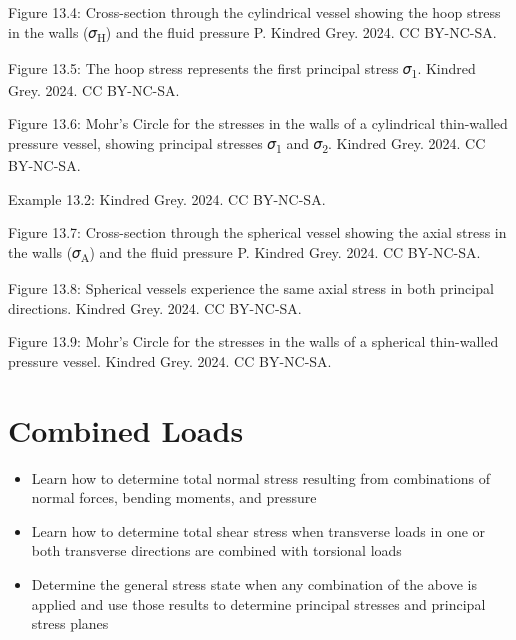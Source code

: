 \documentclass[
  letterpaper,
  DIV=11,
  numbers=noendperiod]{scrreprt}
\providecommand{\tightlist}{%
  \setlength{\itemsep}{0pt}\setlength{\parskip}{0pt}}\usepackage{longtable,booktabs,array}
\theoremstyle{definition}
\theoremstyle{remark}
\begin{document}
Figure 13.4: Cross-section through the cylindrical vessel showing the
hoop stress in the walls (𝜎\textsubscript{H}) and the fluid pressure P.
Kindred Grey. 2024. CC BY-NC-SA.

Figure 13.5: The hoop stress represents the first principal stress
𝜎\textsubscript{1}. Kindred Grey. 2024. CC BY-NC-SA.

Figure 13.6: Mohr's Circle for the stresses in the walls of a
cylindrical thin-walled pressure vessel, showing principal stresses
𝜎\textsubscript{1} and 𝜎\textsubscript{2}. Kindred Grey. 2024. CC
BY-NC-SA.

Example 13.2: Kindred Grey. 2024. CC BY-NC-SA.

Figure 13.7: Cross-section through the spherical vessel showing the
axial stress in the walls (𝜎\textsubscript{A}) and the fluid pressure P.
Kindred Grey. 2024. CC BY-NC-SA.

Figure 13.8: Spherical vessels experience the same axial stress in both
principal directions. Kindred Grey. 2024. CC BY-NC-SA.

Figure 13.9: Mohr's Circle for the stresses in the walls of a spherical
thin-walled pressure vessel. Kindred Grey. 2024. CC BY-NC-SA.


\chapter{Combined Loads}\label{sec-combined-loads}

\begin{tcolorbox}[enhanced jigsaw, leftrule=.75mm, bottomrule=.15mm, opacityback=0, opacitybacktitle=0.6, colframe=quarto-callout-note-color-frame, toprule=.15mm, colbacktitle=quarto-callout-note-color!10!white, coltitle=black, bottomtitle=1mm, title={Learning Objectives}, titlerule=0mm, toptitle=1mm, colback=white, rightrule=.15mm, left=2mm, arc=.35mm, breakable]

\begin{itemize}
\tightlist
\item
  Learn how to determine total normal stress resulting from combinations
  of normal forces, bending moments, and pressure
\item
  Learn how to determine total shear stress when transverse loads in one
  or both transverse directions are combined with torsional loads
\item
  Determine the general stress state when any combination of the above
  is applied and use those results to determine principal stresses and
  principal stress planes
\end{itemize}

\end{tcolorbox}
\end{document}

